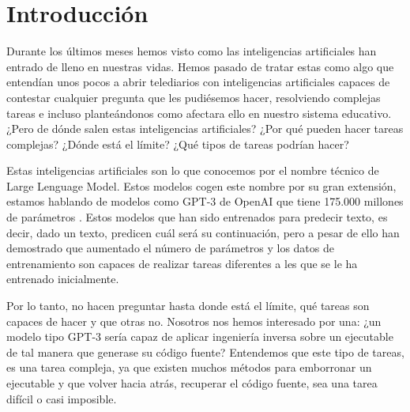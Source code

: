 \chapter{Introducción}
\label{cap:introducion}
\setcounter{page}{1}





Durante los últimos meses hemos visto como las inteligencias artificiales han entrado de lleno en nuestras vidas. Hemos pasado de tratar estas como algo que entendían
unos pocos a abrir telediarios con inteligencias artificiales capaces de contestar cualquier pregunta que les pudiésemos hacer, resolviendo complejas tareas e incluso
planteándonos como afectara ello en nuestro sistema educativo. ¿Pero de dónde salen estas inteligencias artificiales? ¿Por qué pueden hacer tareas complejas?
¿Dónde está el límite? ¿Qué tipos de tareas podrían hacer?

Estas inteligencias artificiales son lo que conocemos por el nombre técnico de Large Lenguage Model. Estos modelos cogen este nombre por su gran extensión, estamos hablando
de modelos como GPT-3 de OpenAI que tiene 175.000 millones de parámetros \cite{BrownTomB2020LMaF}. Estos modelos que han sido entrenados para predecir texto, es decir, dado un texto, predicen cuál será
su continuación, pero a pesar de ello han demostrado que aumentado el número de parámetros y los datos de entrenamiento son capaces de realizar tareas diferentes a les que se
le ha entrenado inicialmente.

Por lo tanto, no hacen preguntar hasta donde está el límite, qué tareas son capaces de hacer y que otras no. Nosotros nos hemos interesado por una: ¿un modelo tipo GPT-3 sería capaz
de aplicar ingeniería inversa sobre un ejecutable de tal manera que generase su código fuente? Entendemos que este tipo de tareas, es una tarea compleja, ya que existen muchos
métodos para emborronar un ejecutable y que volver hacia atrás, recuperar el código fuente, sea una tarea difícil o casi imposible.

